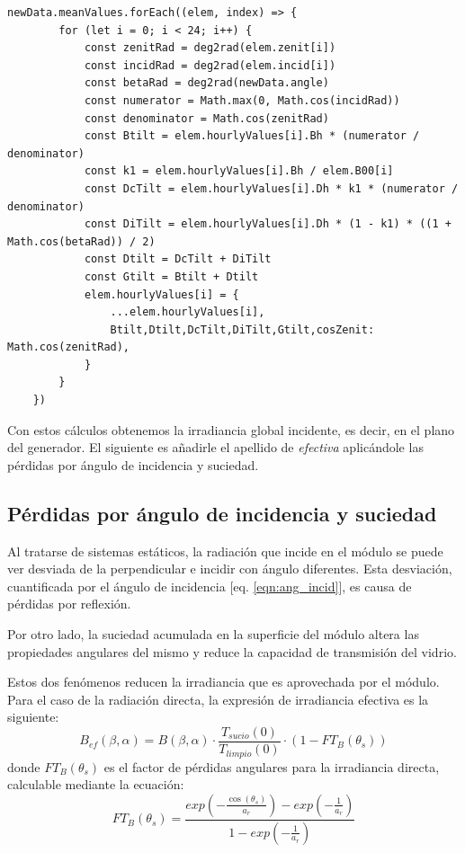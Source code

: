 \begin{lstlisting}[style=ES6, caption={Cálculo del ángulo de incidencia}]
newData.meanValues.forEach((elem, index) => {
		for (let i = 0; i < 24; i++) {
			const zenitRad = deg2rad(elem.zenit[i])
			const incidRad = deg2rad(elem.incid[i])
			const betaRad = deg2rad(newData.angle)
			const numerator = Math.max(0, Math.cos(incidRad))
			const denominator = Math.cos(zenitRad)
			const Btilt = elem.hourlyValues[i].Bh * (numerator / denominator)
			const k1 = elem.hourlyValues[i].Bh / elem.B00[i]
			const DcTilt = elem.hourlyValues[i].Dh * k1 * (numerator / denominator)
			const DiTilt = elem.hourlyValues[i].Dh * (1 - k1) * ((1 + Math.cos(betaRad)) / 2)
			const Dtilt = DcTilt + DiTilt
			const Gtilt = Btilt + Dtilt
			elem.hourlyValues[i] = {
				...elem.hourlyValues[i],
				Btilt,Dtilt,DcTilt,DiTilt,Gtilt,cosZenit: Math.cos(zenitRad),
			}
		}
	})
\end{lstlisting}

Con estos cálculos obtenemos la irradiancia global incidente, es decir, en el plano del generador. El siguiente es añadirle el apellido de \textit{efectiva} aplicándole las pérdidas por ángulo de incidencia y suciedad.

\subsection{Pérdidas por ángulo de incidencia y suciedad}
\label{section:3.5.3}

Al tratarse de sistemas estáticos, la radiación que incide en el módulo se puede ver desviada de la perpendicular e incidir con ángulo diferentes. Esta desviación, cuantificada por el ángulo de incidencia [eq. \ref{eqn:ang_incid}], es causa de pérdidas por reflexión.

Por otro lado, la suciedad acumulada en la superficie del módulo altera las propiedades angulares del mismo y reduce la capacidad de transmisión del vidrio.

Estos dos fenómenos reducen la irradiancia que es aprovechada por el módulo. Para el caso de la radiación directa, la expresión de irradiancia efectiva es la siguiente:
\begin{equation}
B_{ef}(\beta, \alpha)= B(\beta,\alpha)\cdot\frac{T_{sucio}(0)}{T_{limpio}(0)}\cdot(1-FT_B(\theta_s))
\end{equation}
donde $FT_B(\theta_s)$ es el factor de pérdidas angulares para la irradiancia directa, calculable mediante la ecuación:
\begin{equation}
FT_B(\theta_s) = \frac{exp(-\frac{\cos(\theta_s)}{a_r})-exp(-\frac{1}{a_r})}{1-exp(-\frac{1}{a_r})}
\end{equation}

